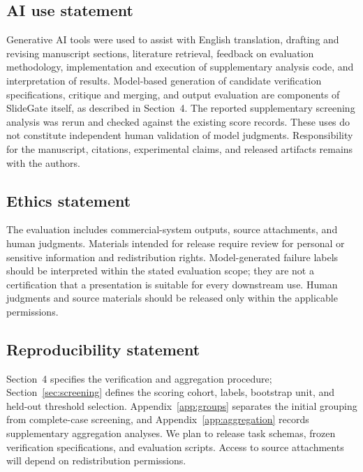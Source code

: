 \subsection*{AI use statement}
Generative AI tools were used to assist with English translation, drafting and revising manuscript sections, literature retrieval, feedback on evaluation methodology, implementation and execution of supplementary analysis code, and interpretation of results. Model-based generation of candidate verification specifications, critique and merging, and output evaluation are components of SlideGate itself, as described in Section~4. The reported supplementary screening analysis was rerun and checked against the existing score records. These uses do not constitute independent human validation of model judgments. Responsibility for the manuscript, citations, experimental claims, and released artifacts remains with the authors.

\subsection*{Ethics statement}
The evaluation includes commercial-system outputs, source attachments, and human judgments. Materials intended for release require review for personal or sensitive information and redistribution rights. Model-generated failure labels should be interpreted within the stated evaluation scope; they are not a certification that a presentation is suitable for every downstream use. Human judgments and source materials should be released only within the applicable permissions.

\subsection*{Reproducibility statement}
Section~4 specifies the verification and aggregation procedure; Section~\ref{sec:screening} defines the scoring cohort, labels, bootstrap unit, and held-out threshold selection. Appendix~\ref{app:groups} separates the initial grouping from complete-case screening, and Appendix~\ref{app:aggregation} records supplementary aggregation analyses. We plan to release task schemas, frozen verification specifications, and evaluation scripts. Access to source attachments will depend on redistribution permissions.
